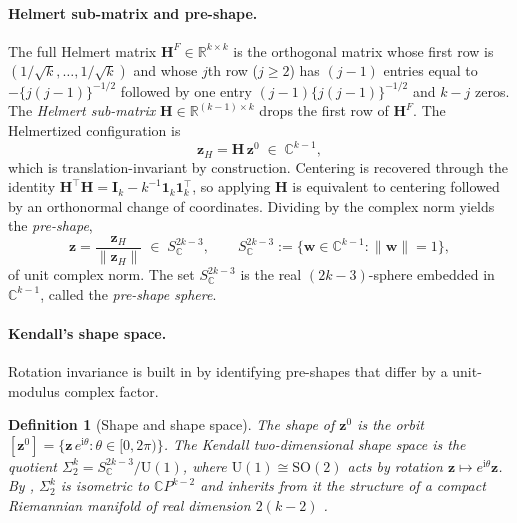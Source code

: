 \documentclass[review,11pt,3p,authoryear]{elsarticle}
\newtheorem{definition}{Definition}[section]
\newcommand{\R}{\mathbb{R}}
\newcommand{\C}{\mathbb{C}}
\newcommand{\CP}{\mathbb{C}P}
\newcommand{\norm}[1]{\|{#1}\|}
\newcommand{\preshape}{S^{2k-3}_{\C}}
\newcommand{\bz}{\mathbf{z}}
\newcommand{\bH}{\mathbf{H}}
\newcommand{\bI}{\mathbf{I}}
\newcommand{\bone}{\mathbf{1}}
\begin{document}
\paragraph{Helmert sub-matrix and pre-shape.}
The full Helmert matrix $\bH^F\in\R^{k\times k}$ is the orthogonal matrix
whose first row is $(1/\sqrt{k},\ldots,1/\sqrt{k})$ and whose $j$th row
($j\ge 2$) has $(j-1)$ entries equal to $-\{j(j-1)\}^{-1/2}$ followed by
one entry $(j-1)\{j(j-1)\}^{-1/2}$ and $k-j$ zeros. The \emph{Helmert
sub-matrix} $\bH\in\R^{(k-1)\times k}$ drops the first row of $\bH^F$.
The Helmertized configuration is
\begin{equation}
  \bz_H = \bH\,\bz^0 \;\in\; \C^{k-1},
  \label{eq:helmert}
\end{equation}
which is translation-invariant by construction. Centering is recovered
through the identity
$\bH^\top\bH = \bI_k - k^{-1}\bone_k\bone_k^\top$, so applying $\bH$ is
equivalent to centering followed by an orthonormal change of coordinates.
Dividing by the complex norm yields the \emph{pre-shape},
\begin{equation}
  \bz = \frac{\bz_H}{\norm{\bz_H}} \;\in\; \preshape,
  \qquad
  \preshape := \{\bm{w}\in\C^{k-1}:\norm{\bm{w}}=1\},
  \label{eq:preshape}
\end{equation}
of unit complex norm. The set $\preshape$ is the real $(2k-3)$-sphere
embedded in $\C^{k-1}$, called the \emph{pre-shape sphere}.

\paragraph{Kendall's shape space.}
Rotation invariance is built in by identifying pre-shapes that differ by
a unit-modulus complex factor.

\begin{definition}[Shape and shape space]
  The \emph{shape} of $\bz^0$ is the orbit
  $[\bz^0] = \{\bz\,e^{\mathrm{i}\theta}:\theta\in[0,2\pi)\}$. The
  \emph{Kendall two-dimensional shape space} is the quotient
  $\Sigma_2^k = \preshape / \mathrm{U}(1)$, where
  $\mathrm{U}(1)\cong\mathrm{SO}(2)$ acts by rotation
  $\bz\mapsto e^{\mathrm{i}\theta}\bz$. By
  \citet{kendall1984shape}, $\Sigma_2^k$ is isometric to $\CP^{k-2}$ and
  inherits from it the structure of a compact Riemannian manifold of
  real dimension $2(k-2)$
  \citep{le1993riemannian,small2012statistical}.
\end{definition}
\end{document}
